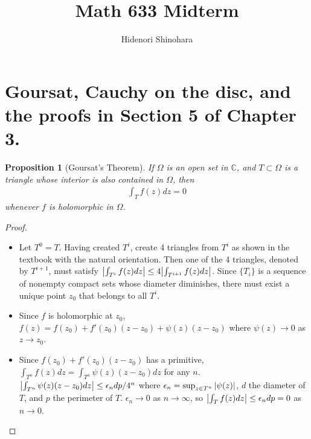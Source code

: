 \documentclass[12pt, psamsfonts]{amsart}
\newtheorem{prop}[thm]{Proposition}
\theoremstyle{definition}
\theoremstyle{remark}
\numberwithin{equation}{section}
\begin{document}
\title{Math 633 Midterm}
\author{Hidenori Shinohara}
\maketitle

\section{Goursat, Cauchy on the disc, and the proofs in Section 5 of Chapter 3.}

\begin{prop}[Goursat's Theorem]
  If $\Omega$ is an open set in $\mathbb{C}$, and $T \subset \Omega$ is a triangle whose interior is also contained in $\Omega$, then
  \begin{align*}
    \int_{T} f(z) dz = 0
  \end{align*}
  whenever $f$ is holomorphic in $\Omega$.
\end{prop}

\begin{proof}
$ $
  \begin{itemize}
    \item
      Let $T^0 = T$.
      Having created $T^i$, create 4 triangles from $T^i$ as shown in the textbook with the natural orientation.
      Then one of the 4 triangles, denoted by $T^{i + 1}$, must satisfy $\abs{\int_{T^i} f(z)dz} \leq 4\abs{\int_{T^{i + 1}} f(z)dz}$.
      Since $\{ T_i \}$ is a sequence of nonempty compact sets whose diameter diminishes, there must exist a unique point $z_0$ that belongs to all $T^i$.
    \item
      Since $f$ is holomorphic at $z_0$, $f(z) = f(z_0) + f'(z_0)(z - z_0) + \psi(z)(z - z_0)$ where $\psi(z) \rightarrow 0$ as $z \rightarrow z_0$.
    \item
      Since $f(z_0) + f'(z_0)(z - z_0)$ has a primitive, $\int_{T^n} f(z)dz = \int_{T^n}\psi(z)(z - z_0)dz$ for any $n$.
      $\abs{\int_{T^n}\psi(z)(z - z_0)dz} \leq \epsilon_ndp / 4^n$ where $\epsilon_n = \sup_{z \in T^n} \abs{\psi(z)}$, $d$ the diameter of $T$, and $p$ the perimeter of $T$.
      $\epsilon_n \rightarrow 0$ as $n \rightarrow \infty$, so $\abs{\int_{T} f(z)dz} \leq \epsilon_ndp = 0$ as $n \rightarrow 0$.
  \end{itemize}
\end{proof}
\end{document}
